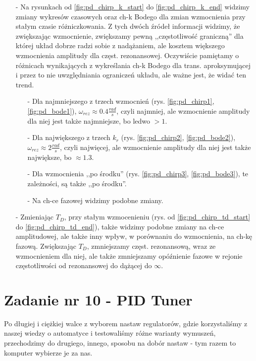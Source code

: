 \documentclass[11 pt]{article}
\begin{document}
\begin{itemize}
\item[-] Na rysunkach od \ref{fig:pd_chirp_k_start} do \ref{fig:pd_chirp_k_end} widzimy zmiany wykresów czasowych oraz ch-k Bodego dla zmian wzmocnienia przy stałym czasie różniczkowania. Z tych dwóch źródeł informacji widzimy, że zwiększając wzmocnienie, zwiększamy pewną ,,częstotliwość graniczną'' dla której układ dobrze radzi sobie z nadążaniem, ale kosztem większego wzmocnienia amplitudy dla częst. rezonansowej. Oczywiście pamiętamy o różnicach wynikających z wykreślania ch-k Bodego dla trans. aproksymującej i przez to nie uwzględniania ograniczeń układu, ale ważne jest, że widać ten trend.
\begin{itemize}
\item[-] Dla najmniejszego z trzech wzmocnień (rys. \ref{fig:pd_chirp1}, \ref{fig:pd_bode1}), $\omega_{rez} \approx 0.4 \frac{rad}{s}$, czyli najmniej, ale wzmocnienie amplitudy dla niej jest także najmniejsze, bo ledwo $> 1$.
\item[-] Dla największego z trzech $k_r$ (rys. \ref{fig:pd_chirp2}, \ref{fig:pd_bode2}),  $\omega_{rez} \approx 2 \frac{rad}{s}$, czyli najwięcej, ale wzmocnienie amplitudy dla niej jest także największe, bo $\approx 1.3$.
\item[-] Dla wzmocnienia ,,po środku'' (rys. \ref{fig:pd_chirp3}, \ref{fig:pd_bode3}), te zależności, są także ,,po środku''.
\item[-] Na ch-ce fazowej widzimy podobne zmiany. 
\end{itemize}

\item[-] Zmieniając $T_D$, przy stałym wzmocenieniu (rys. od \ref{fig:pd_chirp_td_start} do \ref{fig:pd_chirp_td_end}), także widzimy podobne zmiany na ch-ce amplitudowej, ale także inny wpływ, w porównaniu do wzmocnienia, na ch-kę fazową. Zwiększając $T_D$, zmniejszamy częst. rezonansową, wraz ze wzmocnieniem dla niej, ale także zmniejszamy opóźnienie fazowe w rejonie częstotliwości od rezonansowej do dążącej do $\infty$.
\end{itemize}

\newpage

\setcounter{section}{10}
\setcounter{figure}{0}
\section*{Zadanie nr 10 - PID Tuner}

Po długiej i ciężkiej walce z wyborem nastaw regulatorów, gdzie korzystaliśmy z naszej wiedzy o automatyce i testowaliśmy różne warianty wymuszeń, przechodzimy do drugiego, innego, sposobu na dobór nastaw - tym razem to komputer wybierze je za nas.
\end{document}
